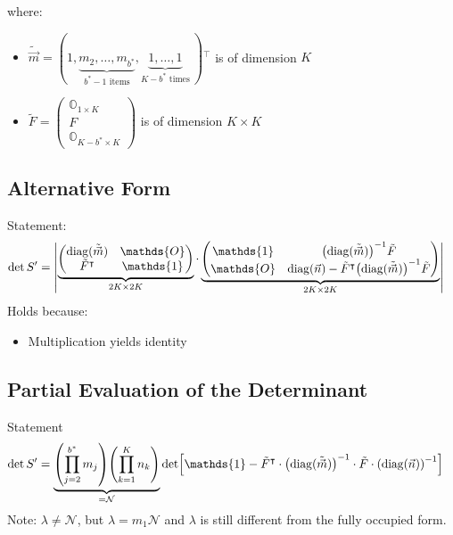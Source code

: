 \documentclass[
	english,
	a4paper,
	fontsize=10pt,
	parskip=half,
	titlepage=true,
	DIV=12,
	final
]{scrreprt}
\newcommand*{\transp}{\ensuremath{^\intercal}}
\DeclareMathOperator{\diag}{diag}
\begin{document}
where:
\begin{itemize}
\item $\tilde{\vec{m}} = (
	1,
	\underbrace{m_2, \ldots, m_{b^*}}_{b^* -1 \text{ items}},
	\underbrace{1, \ldots, 1}_{K - b^* \text{ times}}
	~)\transp$ is of dimension $K$
\item $\tilde{F} = \begin{pmatrix}
		\mathds{O}_{1 \times K} \\ 
		F \\ 
		\mathds{O}_{K - b^* \times K}
	\end{pmatrix}$
	is of dimension $K \times K$
\end{itemize}

\subsection{Alternative Form}
Statement:
\begin{align}
	\det S'
&=
	\mqty|
		\underbrace{\begin{pmatrix}
			\diag(\tilde{\vec{m}})	& \mathds{O}			\\
			\tilde{F}\transp			& \mathds{1}
		\end{pmatrix}}_{2K \times 2K}
		\cdot
		\underbrace{\begin{pmatrix}
			\mathds{1}	&	\qty(\diag(\tilde{\vec{m}}))^{-1} \tilde{F}		\\
			\mathds{O}	&	\diag(\vec{n}) - \tilde{F}\transp \qty(\diag(\tilde{\vec{m}}))^{-1}\tilde{F}
		\end{pmatrix}}_{2K \times 2K}
	|
	\label{eqn:detSPrime_m}
\end{align}
Holds because:
\begin{itemize}
\item Multiplication yields identity
\end{itemize}

\subsection{Partial Evaluation of the Determinant}
Statement
\begin{align}
	\det S'
&=
	\underbrace{
		\qty( \prod_{j=2}^{b^*} m_j )
		\qty( \prod_{k=1}^{K}   n_k )
	}_{= \mathcal{N} }
	\det[
		\mathds{1} -
		\tilde{F}\transp \cdot \qty( \diag(\tilde{\vec{m}}) )^{-1}
		\cdot
		\tilde{F} \cdot \qty( \diag(\vec{n}) )^{-1}
	]
\label{eqn:detSPrimePartial}
\end{align}
Note: $\lambda \neq \mathcal{N}$, but $\lambda = m_1 \mathcal{N}$ {\color{red} and $\lambda$ is still different from the fully occupied form}.
\end{document}
